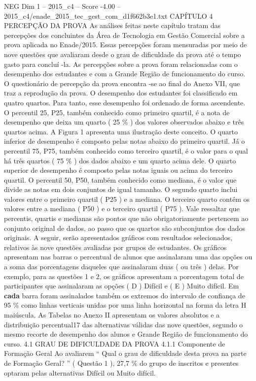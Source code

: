 \begin{textsample}{NEG Dim 1 – 2015\_c4 – Score -4.00 – 2015\_c4/enade\_2015\_tec\_gest\_com\_d1f662b3e1.txt}  \label{ex:f1_neg_108}
CAPÍTULO 4 PERCEPÇÃO DA PROVA As análises feitas neste capítulo tratam das percepções dos concluintes da Área de Tecnologia em Gestão Comercial sobre a prova aplicada no Enade/2015.
Essas percepções foram mensuradas por meio de nove questões que avaliaram desde o grau de dificuldade da prova até o tempo gasto para concluí -la.
As percepções sobre a prova foram relacionadas com o desempenho dos estudantes e com a Grande Região de funcionamento do curso.
O questionário de percepção da prova encontra -se ao final do Anexo VII, que traz a reprodução da prova.
O desempenho dos estudantes foi classificado em quatro quartos.
Para tanto, esse desempenho foi ordenado de forma ascendente.
O percentil 25, P25, também conhecido como primeiro quartil, é a nota de desempenho que deixa um quarto ( 25 \% ) dos valores observados abaixo e três quartos acima.
A Figura 1 apresenta uma ilustração deste conceito.
O quarto inferior de desempenho é composto pelas notas abaixo do primeiro quartil.
Já o percentil 75, P75, também conhecido como terceiro quartil, é o valor para o qual há três quartos ( 75 \% ) dos dados abaixo e um quarto acima dele.
O quarto superior de desempenho é composto pelas notas iguais ou acima do terceiro quartil.
O percentil 50, P50, também conhecido como mediana, é o valor que divide as notas em dois conjuntos de igual tamanho.
O segundo quarto inclui valores entre o primeiro quartil ( P25 ) e a mediana.
O terceiro quarto contém os valores entre a mediana ( P50 ) e o terceiro quartil ( P75 ).
Vale ressaltar que percentis, quartis e medianas são pontos que não obrigatoriamente pertencem ao conjunto original de dados, ao passo que os quartos são subconjuntos dos dados originais.
A seguir, serão apresentados gráficos com resultados selecionados, relativos às nove questões avaliadas por grupos de estudantes.
Os gráficos apresentam nas barras o percentual de alunos que assinalaram uma das opções ou a soma das porcentagens daqueles que assinalaram duas ( ou três ) delas.
Por exemplo, para as questões 1 e 2, os gráficos apresentam a porcentagem total de participantes que assinalaram as opções ( D ) Difícil e ( E ) Muito difícil.
Em \textbf{cada} barra foram assinalados também os extremos do intervalo de confiança de 95 \% como linhas verticais unidas por uma linha horizontal na forma da letra H maiúscula.
As Tabelas no Anexo II apresentam os valores absolutos e a distribuição percentual17 das alternativas válidas das nove questões, segundo o mesmo recorte de desempenho dos alunos e Grande Região de funcionamento do curso. 4.1 GRAU DE DIFICULDADE DA PROVA 4.1.1 Componente de Formação Geral Ao avaliarem “ Qual o grau de dificuldade desta prova na parte de Formação Geral? ” ( Questão 1 ), 27,7 \% do grupo de inscritos e presentes optaram pelas alternativas Difícil ou Muito difícil.

\end{textsample}
